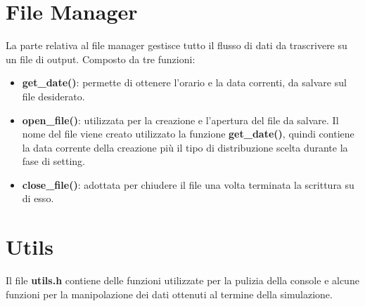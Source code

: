 \section{File Manager}
La parte relativa al file manager gestisce tutto il flusso di dati da 
trascrivere  su un file di output. Composto da tre funzioni:
\begin{itemize}
\item \textbf{get\_date()}: permette di ottenere l'orario e la data correnti, da 
salvare sul file desiderato.
\item \textbf{open\_file()}: utilizzata per la creazione e l'apertura 
del file da salvare. Il nome del file viene creato utilizzato la funzione 
\textbf{get\_date()}, quindi contiene la data corrente della creazione più il tipo di 
distribuzione scelta durante la fase di setting.
\item \textbf{close\_file()}: adottata per chiudere il file una volta 
terminata la scrittura su di esso.
\end{itemize}

\section{Utils}
Il file \textbf{utils.h} contiene delle funzioni utilizzate per la pulizia della console 
e alcune funzioni per la manipolazione dei dati ottenuti al termine della simulazione.

